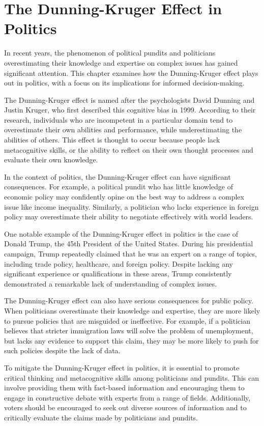 \documentclass{report}%
\begin{document}
{{{%
\chapter{The Dunning-Kruger Effect in Politics}

In recent years, the phenomenon of political pundits and politicians overestimating their knowledge and expertise on complex issues has gained significant attention. This chapter examines how the Dunning-Kruger effect plays out in politics, with a focus on its implications for informed decision-making.

The Dunning-Kruger effect is named after the psychologists David Dunning and Justin Kruger, who first described this cognitive bias in 1999. According to their research, individuals who are incompetent in a particular domain tend to overestimate their own abilities and performance, while underestimating the abilities of others. This effect is thought to occur because people lack metacognitive skills, or the ability to reflect on their own thought processes and evaluate their own knowledge.

In the context of politics, the Dunning-Kruger effect can have significant consequences. For example, a political pundit who has little knowledge of economic policy may confidently opine on the best way to address a complex issue like income inequality. Similarly, a politician who lacks experience in foreign policy may overestimate their ability to negotiate effectively with world leaders.

One notable example of the Dunning-Kruger effect in politics is the case of Donald Trump, the 45th President of the United States. During his presidential campaign, Trump repeatedly claimed that he was an expert on a range of topics, including trade policy, healthcare, and foreign policy. Despite lacking any significant experience or qualifications in these areas, Trump consistently demonstrated a remarkable lack of understanding of complex issues.

The Dunning-Kruger effect can also have serious consequences for public policy. When politicians overestimate their knowledge and expertise, they are more likely to pursue policies that are misguided or ineffective. For example, if a politician believes that stricter immigration laws will solve the problem of unemployment, but lacks any evidence to support this claim, they may be more likely to push for such policies despite the lack of data.

To mitigate the Dunning-Kruger effect in politics, it is essential to promote critical thinking and metacognitive skills among politicians and pundits. This can involve providing them with fact-based information and encouraging them to engage in constructive debate with experts from a range of fields. Additionally, voters should be encouraged to seek out diverse sources of information and to critically evaluate the claims made by politicians and pundits.

}}}
\end{document}

